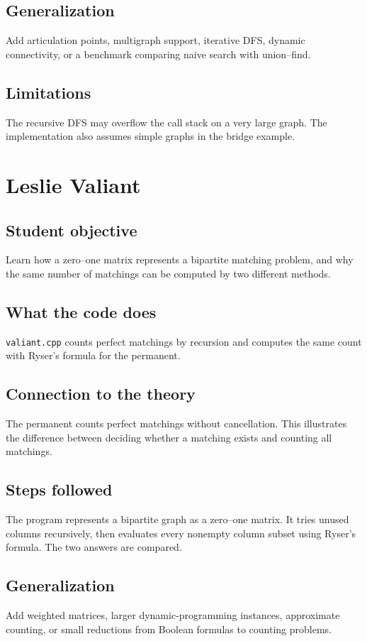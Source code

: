 \documentclass[11pt]{book}
\begin{document}
\section{Generalization}
Add articulation points, multigraph support, iterative DFS, dynamic connectivity, or a benchmark comparing naive search with union--find.

\section{Limitations}
The recursive DFS may overflow the call stack on a very large graph. The implementation also assumes simple graphs in the bridge example.

\chapter{Leslie Valiant}
\section{Student objective}
Learn how a zero--one matrix represents a bipartite matching problem, and why the same number of matchings can be computed by two different methods.
\section{What the code does}
\texttt{valiant.cpp} counts perfect matchings by recursion and computes the same count with Ryser's formula for the permanent.

\section{Connection to the theory}
The permanent counts perfect matchings without cancellation. This illustrates the difference between deciding whether a matching exists and counting all matchings.

\section{Steps followed}
The program represents a bipartite graph as a zero--one matrix. It tries unused columns recursively, then evaluates every nonempty column subset using Ryser's formula. The two answers are compared.

\section{Generalization}
Add weighted matrices, larger dynamic-programming instances, approximate counting, or small reductions from Boolean formulas to counting problems.
\end{document}
